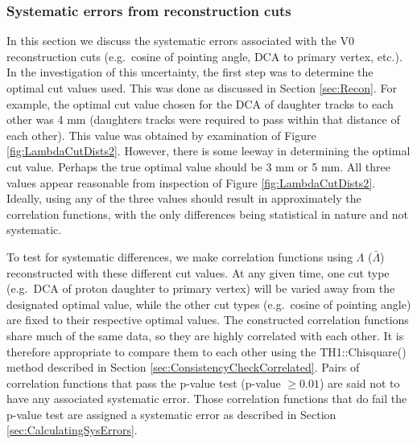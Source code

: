 


\subsubsection{Systematic errors from reconstruction cuts}
\label{sec:SystematicsReconstruction}

In this section we discuss the systematic errors associated with the V0 reconstruction cuts (e.g.\ cosine of pointing angle, DCA to primary vertex, etc.).  
In the investigation of this uncertainty, the first step was to determine the optimal cut values used.  
This was done as discussed in Section \ref{sec:Recon}.  For example, the optimal cut value chosen for the DCA of daughter tracks to each other was 4 mm (daughters tracks were required to pass within that distance of each other).  
This value was obtained by examination of Figure \ref{fig:LambdaCutDists2}.  However, there is some leeway in determining the optimal cut value.  
Perhaps the true optimal value should be 3 mm or 5 mm.  All three values appear reasonable from inspection of Figure \ref{fig:LambdaCutDists2}.  
Ideally, using any of the three values should result in approximately the correlation functions, with the only differences being statistical in nature and not systematic.  

To test for systematic differences, we make correlation functions using $\Lambda$ ($\bar{\Lambda}$) reconstructed with these different cut values. 
At any given time, one cut type (e.g.\ DCA of proton daughter to primary vertex) will be varied away from the designated optimal value, while the other cut types (e.g.\ cosine of pointing angle) are fixed to their respective optimal values. 
The constructed correlation functions share much of the same data, so they are highly correlated with each other.  
It is therefore appropriate to compare them to each other using the TH1::Chisquare() method described in Section \ref{sec:ConsistencyCheckCorrelated}.  
Pairs of correlation functions that pass the p-value test (p-value $\geq 0.01$) are said not to have any associated systematic error.  
Those correlation functions that do fail the p-value test are assigned a systematic error as described in Section \ref{sec:CalculatingSysErrors}.



